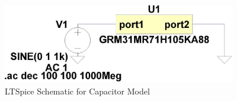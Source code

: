 \begin{figure}[ht!]
\includegraphics[keepaspectratio=true,width=4in]{./figures/appendix/exCapData_ltspice.jpg}
\centering
\caption{LTSpice Schematic for Capacitor Model}
\label{fig:exCapData_ltspice}
\end{figure}
